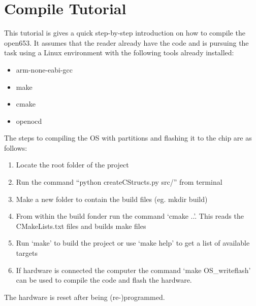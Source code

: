 \chapter{Compile Tutorial}
\label{app:tutorial}
This tutorial is gives a quick step-by-step introduction on how to compile the open653.
It assumes that the reader already have the code and is pursuing the task using a Linux environment
with the following tools already installed:

\begin{itemize}
	\item arm-none-eabi-gcc
	\item make
	\item cmake
	\item openocd
\end{itemize}

The steps to compiling the OS with partitions and
flashing it to the chip are as follows:

\begin{enumerate}
	\item Locate the root folder of the project
	\item Run the command ``python createCStructs.py src/'' from terminal
	\item Make a new folder to contain the build files (eg. mkdir build)
	\item From within the build fonder run the command `cmake ..'.
		This reads the CMakeLists.txt files and builds make files
	\item Run `make' to build the project or use `make help' to get a list of available targets
	\item If hardware is connected the computer the command `make OS\_writeflash'
		can be used to compile the code and flash the hardware.
\end{enumerate}

The hardware is reset after being (re-)programmed.

